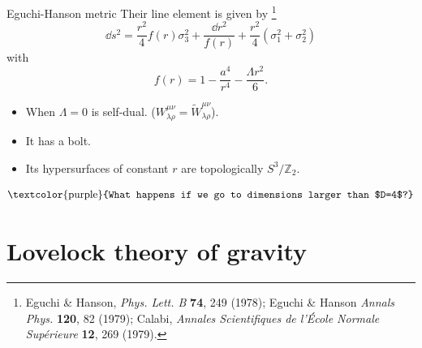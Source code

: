 \documentclass[aspectratio=169,xcolor=dvipsnames]{beamer}
\begin{document}

\begin{frame}{Eguchi-Hanson metric}\justifying
Their line element is given by \footnote{Eguchi \& Hanson, \textit{Phys. Lett. B} \textbf{74}, 249 (1978); Eguchi \& Hanson \textit{Annals Phys.} \textbf{120}, 82 (1979); Calabi, \textit{Annales Scientifiques de l'École Normale Supérieure} \textbf{12}, 269 (1979).}
\begin{equation*}
    \dd s^2=\frac{r^2}{4}f(r)\sigma_3^2+\frac{\dd r^2}{f(r)}+\frac{r^2}{4}(\sigma_1^2+\sigma_2^2)
\end{equation*}
with
\begin{equation*}
    f(r)=1-\frac{a^4}{r^4}-\frac{\Lambda r^2}{6}.
\end{equation*}
\begin{itemize}
    \item When $\Lambda = 0$ is self-dual. ($W^{\mu\nu}_{\lambda\rho}=\tilde{W}^{\mu\nu}_{\lambda\rho}$).
    \item It has a bolt.
    \item Its hypersurfaces of constant $r$ are topologically $S^3/\mathbb{Z}_2$.
\end{itemize}
\end{frame}

\begin{frame}\justifying
    \begin{equation*}
        \text{\textcolor{purple}{What happens if we go to dimensions larger than $D=4$?}}
    \end{equation*}
\end{frame}



\section{Lovelock theory of gravity}
\end{document}
